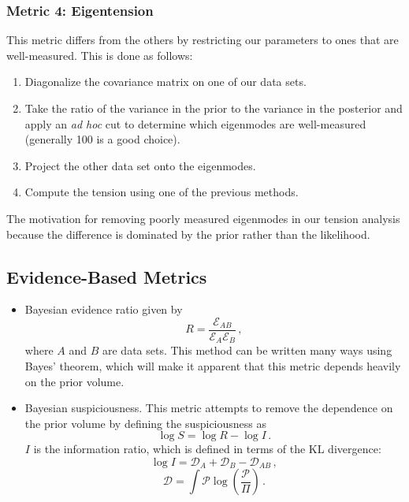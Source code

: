 \subsubsection{Metric 4: Eigentension}
This metric differs from the others by restricting our parameters to ones that are well-measured. This is done as follows:
\begin{enumerate}
	\item Diagonalize the covariance matrix on one of our data sets.
	\item Take the ratio of the variance in the prior to the variance in the posterior and apply an \textit{ad hoc} cut to determine which eigenmodes are well-measured (generally 100 is a good choice).
	\item Project the other data set onto the eigenmodes.
	\item Compute the tension using one of the previous methods.
\end{enumerate}
The motivation for removing poorly measured eigenmodes in our tension analysis because the difference is dominated by the prior rather than the likelihood.
\subsection{Evidence-Based Metrics}
\begin{itemize}
	\item Bayesian evidence ratio given by
	\begin{equation}
		R = \frac{\mathcal{E}_{AB}}{\mathcal{E}_A\mathcal{E}_B}\,,
	\end{equation}
	where $A$ and $B$ are data sets. This method can be written many ways using Bayes' theorem, which will make it apparent that this metric depends heavily on the prior volume.
    \item Bayesian suspiciousness. This metric attempts to remove the dependence on the prior volume by defining the suspiciousness as 
	\begin{equation}
		\log S = \log R - \log I\,.
	\end{equation}
	$I$ is the information ratio, which is defined in terms of the KL divergence:
	\begin{equation}
		\log I = \mathcal{D}_A + \mathcal{D}_B - \mathcal{D}_{AB}\,,
	\end{equation}
	\begin{equation}
		\mathcal{D} = \int \mathcal{P} \log(\frac{\mathcal{P}}{\Pi})\,.
	\end{equation}
\end{itemize}
